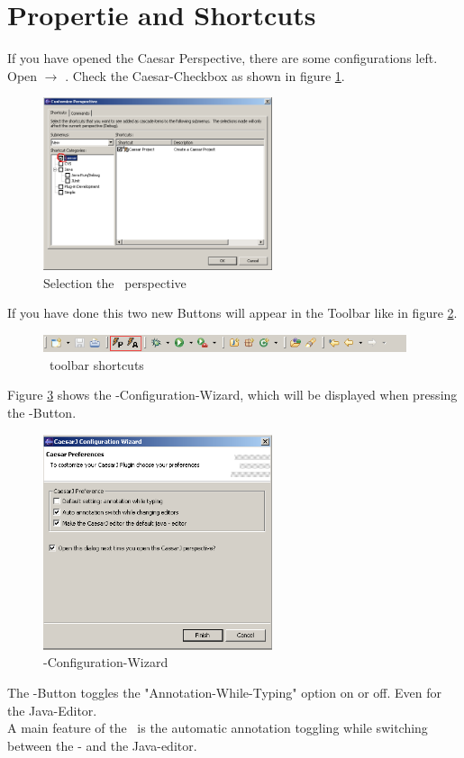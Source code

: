 \section{Propertie and Shortcuts}
If you have opened the Caesar Perspective, there are some configurations left. Open  $\rightarrow$ . Check the Caesar-Checkbox as shown in figure \ref{fig:propert}.

\begin{figure}[htbp]
	\centering
		\includegraphics[width=0.60\textwidth]{images/propert.png}
	\caption{Selection the \caesarj ~perspective}
	\label{fig:propert}
\end{figure}

If you have done this two new Buttons will appear in the Toolbar like in figure \ref{fig:toolbar}.

\begin{figure}[htbp]
	\centering
		\includegraphics[width=0.95\textwidth]{images/toolbar.png}
	\caption{\caesarj ~toolbar shortcuts}
	\label{fig:toolbar}
\end{figure}

Figure \ref{fig:properties} shows the \caesarj -Configuration-Wizard, which will be displayed when pressing the -Button.

\begin{figure}[htbp]
	\centering
		\includegraphics[width=0.60\textwidth]{images/view_properties.png}
	\caption{\caesarj -Configuration-Wizard}
	\label{fig:properties}
\end{figure}

The -Button toggles the "Annotation-While-Typing" option on or off. Even for the Java-Editor.\\
A main feature of the \cjdt ~is the automatic annotation toggling while switching between the \caesarj - and the Java-editor.


